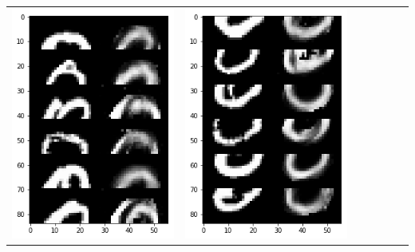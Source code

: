 \documentclass[12pt]{report} %
\begin{document}
\begin{tabular}{m{0.7cm}m{2.4cm}m{2.4cm}m{2.4cm}m{2.4cm}m{2.4cm}m{2.4cm}}
	\includegraphics[scale=0.3]{pictures/M1_0_up.png} & \includegraphics[scale=0.3]{pictures/M1_0_down.png} &

\end{tabular}
\end{document}
